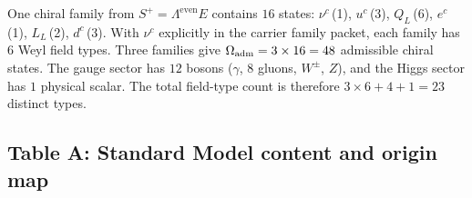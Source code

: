\begin{remark}
\label{rem:counting-convention}
One chiral family from $S^+=\Lambda^{\mathrm{even}}E$ contains $16$ states:
$\nu^c$\,(1), $u^c$\,(3), $Q_L$\,(6), $e^c$\,(1), $L_L$\,(2), $d^c$\,(3).
With $\nu^c$ explicitly in the carrier family packet, each family has $6$ Weyl field types.
Three families give $\Omega_{\mathrm{adm}}=3\times 16=48$ admissible chiral states.
The gauge sector has $12$ bosons ($\gamma$, $8$ gluons, $W^\pm$, $Z$), and the Higgs sector has
$1$ physical scalar. The total field-type count is therefore $3\times 6+4+1=23$ distinct types.
\end{remark}

\subsection{Table A: Standard Model content and origin map}

